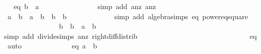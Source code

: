 \begin{isabellebody}
\ \isamarkupfalse%
\ eq{}{\isacharcolon}\ {\isachardoublequoteopen}{\isacharparenleft}b{}{\isacharcircum}{}\ {\isacharminus}\ a{}{\isacharcircum}{}{\isacharparenright}\ {\isacharequal}\ {}{\isachardoublequoteclose}\ \isanewline
\ \ \ \ \ \ \ \ \ \ \ \ \isamarkupfalse%
{\isacharparenleft}simp\ add{\isacharcolon}\ a{}{\isacharunderscore}nz\ a{}{\isacharunderscore}nz{\isacharparenright}\isanewline
\ \ \ \ \isanewline
\ \ \ \ \ \ \ \ \ \ \isamarkupfalse%
\ {\isachardoublequoteopen}a{}{\isacharcircum}{}\ {\isacharminus}\ b{}{\isacharcircum}{}\ {\isacharequal}\ a{}{\isacharcircum}{}\ {\isacharasterisk}\ {\isacharparenleft}b{}{\isacharcircum}{}\ {\isacharslash}\ b{}{\isacharcircum}{}{\isacharparenright}\ {\isacharminus}\ b{}{\isacharcircum}{}{\isachardoublequoteclose}\isanewline
\ \ \ \ \ \ \ \ \ \ \ \ \isamarkupfalse%
{\isacharparenleft}simp\ add{\isacharcolon}\ algebra{\isacharunderscore}simps\ eq{}\ power{}{\isacharunderscore}eq{\isacharunderscore}square{\isacharparenright}\isanewline
\ \ \ \ \ \ \ \ \ \ \isamarkupfalse%
\ \isamarkupfalse%
\ {\isachardoublequoteopen}{\isachardot}{\isachardot}{\isachardot}\ {\isacharequal}\ {\isacharparenleft}b{}{\isacharcircum}{}\ {\isacharslash}\ b{}{\isacharcircum}{}{\isacharparenright}\ {\isacharasterisk}\ {\isacharparenleft}a{}{\isacharcircum}{}\ {\isacharminus}\ b{}{\isacharcircum}{}{\isacharparenright}{\isachardoublequoteclose}\isanewline
\ \ \ \ \ \ \ \ \ \ \ \ \isamarkupfalse%
{\isacharparenleft}simp\ add{\isacharcolon}\ divide{\isacharunderscore}simps\ a{}{\isacharunderscore}nz\ right{\isacharunderscore}diff{\isacharunderscore}distrib{\isacharprime}{\isacharparenright}\isanewline
\ \ \ \ \ \ \ \ \ \ \isamarkupfalse%
\ \isamarkupfalse%
\ {\isachardoublequoteopen}{\isachardot}{\isachardot}{\isachardot}\ {\isacharequal}\ {}{\isachardoublequoteclose}\ \isanewline
\ \ \ \ \ \ \ \ \ \ \ \ \isamarkupfalse%
\ eq{}\ \isamarkupfalse%
\ auto\isanewline
\ \ \ \ \ \ \ \ \ \ \isamarkupfalse%
\ \isamarkupfalse%
\ eq{}{\isacharcolon}\ {\isachardoublequoteopen}a{}{\isacharcircum}{}\ {\isacharminus}\ b{}{\isacharcircum}{}\ {\isacharequal}\ {}{\isachardoublequoteclose}\ \isamarkupfalse%

\end{isabellebody}
